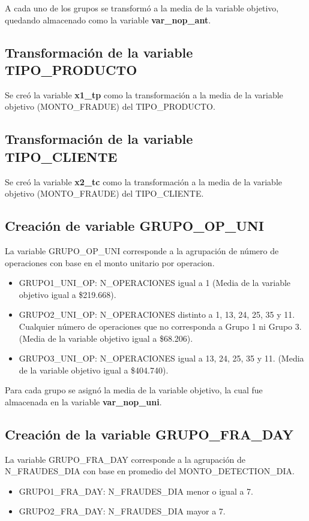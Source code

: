 \documentclass[
	11pt, %
	spanish, %
]{fphw}
\begin{document}
A cada uno de los grupos se transformó a la media de la variable objetivo, quedando almacenado como la variable \textbf{var\_nop\_ant}.

\subsection*{Transformación de la variable TIPO\_PRODUCTO}
Se creó la variable \textbf{x1\_tp} como la transformación a la media de la variable objetivo (MONTO\_FRADUE) del TIPO\_PRODUCTO.

\subsection*{Transformación de la variable TIPO\_CLIENTE}
Se creó la variable \textbf{x2\_tc} como la transformación a la media de la variable objetivo (MONTO\_FRAUDE) del TIPO\_CLIENTE.

\subsection*{Creación de variable GRUPO\_OP\_UNI}
La variable GRUPO\_OP\_UNI corresponde a la agrupación de número de operaciones con base en el monto unitario por operacion.
\begin{itemize}
\item GRUPO1\_UNI\_OP: N\_OPERACIONES igual a 1 (Media de la variable objetivo igual a \$219.668).
\item GRUPO2\_UNI\_OP: N\_OPERACIONES distinto a 1, 13, 24, 25, 35 y 11. Cualquier número de operaciones que no corresponda a Grupo 1 ni Grupo 3. (Media de la variable objetivo igual a \$68.206).
\item GRUPO3\_UNI\_OP: N\_OPERACIONES igual a 13, 24, 25, 35 y 11. (Media de la variable objetivo igual a \$404.740).
\end{itemize}

Para cada grupo se asignó la media de la variable objetivo, la cual fue almacenada en la variable \textbf{var\_nop\_uni}.


\subsection*{Creación de la variable GRUPO\_FRA\_DAY}
La variable GRUPO\_FRA\_DAY corresponde a la agrupación de N\_FRAUDES\_DIA con base en promedio del MONTO\_DETECTION\_DIA.

\begin{itemize}
\item GRUPO1\_FRA\_DAY: N\_FRAUDES\_DIA menor o igual a 7.
\item GRUPO2\_FRA\_DAY: N\_FRAUDES\_DIA mayor a 7.
\end{itemize}
\end{document}
